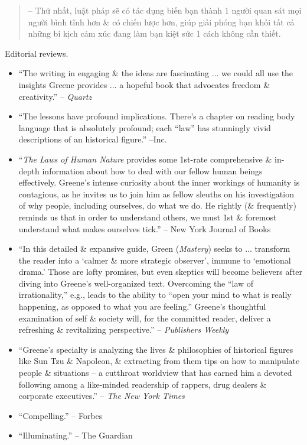 \documentclass{article}
\begin{document}
\begin{enumerate}
\begin{quotation}
		-- Thứ nhất, luật pháp sẽ có tác dụng biến bạn thành 1 người quan sát mọi người bình tĩnh hơn \& có chiến lược hơn, giúp giải phóng bạn khỏi tất cả những bi kịch cảm xúc đang làm bạn kiệt sức 1 cách không cần thiết.
	\end{quotation}
	{\sf Editorial reviews.}
	\begin{itemize}
		\item ``The writing in engaging \& the ideas are fascinating $\ldots$ we could all use the insights {\sc Greene} provides $\ldots$ a hopeful book that advocates freedom \& creativity.'' -- {\it Quartz}
		\item ``The lessons have profound implications. There's a chapter on reading body language that is absolutely profound; each ``law'' has stunningly vivid descriptions of an historical figure.'' --Inc.
		\item ``{\it The Laws of Human Nature} provides some 1st-rate comprehensive \& in-depth information about how to deal with our fellow human beings effectively. {\sc Greene}'s intense curiosity about the inner workings of humanity is contagious, as he invites us to join him as fellow sleuths on his investigation of why people, including ourselves, do what we do. He rightly (\& frequently) reminds us that in order to understand others, we must 1st \& foremost understand what makes ourselves tick.'' -- New York Journal of Books
		\item ``In this detailed \& expansive guide, {\sc Green} ({\it Mastery}) seeks to $\ldots$ transform the reader into a `calmer \& more strategic observer', immune to `emotional drama.' Those are lofty promises, but even skeptics will become believers after diving into {\sc Greene}'s well-organized text. Overcoming the ``law of irrationality,'' e.g., leads to the ability to ``open your mind to what is really happening, as opposed to what you are feeling.'' {\sc Greene}'s thoughtful examination of self \& society will, for the committed reader, deliver a refreshing \& revitalizing perspective.'' -- {\it Publishers Weekly}
		\item ``{\sc Greene}'s specialty is analyzing the lives \& philosophies of historical figures like {\sc Sun Tzu} \& {\sc Napoleon}, \& extracting from them tips on how to manipulate people \& situations -- a cutthroat worldview that has earned him a devoted following among a like-minded readership of rappers, drug dealers \& corporate executives.'' -- {\it The New York Times}
		\item ``Compelling.'' -- Forbes
		\item ``Illuminating.'' -- The Guardian

\end{itemize}
\end{enumerate}
\end{document}
